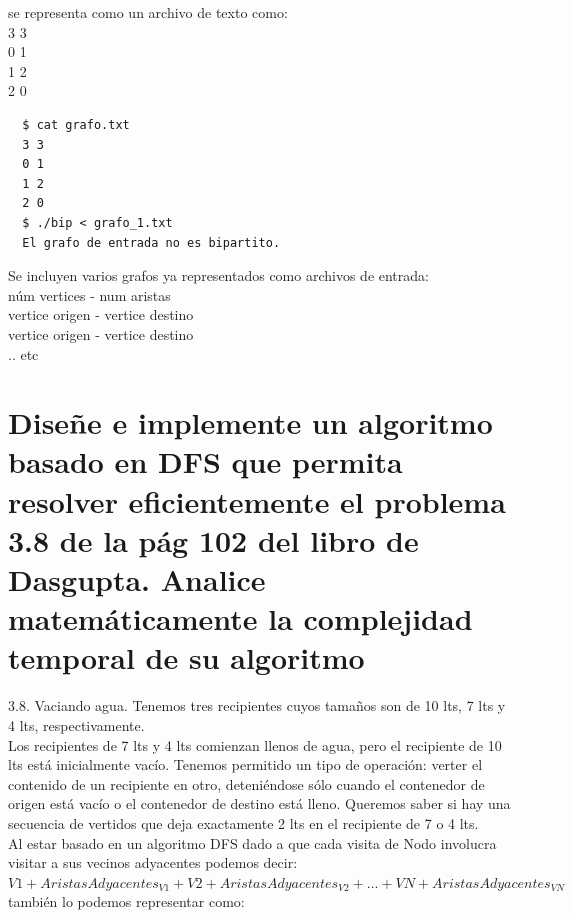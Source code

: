 \documentclass{article}
\begin{document}
se representa como un archivo de texto como:\\
3 3\\
0 1\\
1 2\\
2 0\\

\begin{commandline}
\begin{verbatim}
  $ cat grafo.txt
  3 3
  0 1
  1 2
  2 0
  $ ./bip < grafo_1.txt
  El grafo de entrada no es bipartito.
\end{verbatim}
\end{commandline}

Se incluyen varios grafos ya representados como archivos de entrada:\\
núm vertices - num aristas\\
vertice origen - vertice destino\\
vertice origen - vertice destino\\
.. etc\\

\newpage
\section{Diseñe e implemente un algoritmo basado en DFS que permita resolver eficientemente el problema 3.8 de la pág 102 del libro de Dasgupta. Analice matemáticamente la complejidad temporal de su algoritmo}

3.8. Vaciando agua. Tenemos tres recipientes cuyos tamaños son de 10 lts, 7 lts y 4 lts, respectivamente.\\
Los recipientes de 7 lts y 4 lts comienzan llenos de agua, pero el recipiente de 10 lts está inicialmente vacío. Tenemos permitido un tipo de operación: verter el contenido de un recipiente en otro, deteniéndose sólo cuando el contenedor de origen está vacío o el contenedor de destino está lleno. Queremos saber si hay una secuencia de vertidos que deja exactamente 2 lts en el recipiente de 7 o 4 lts.\\

Al estar basado en un algoritmo DFS dado a que cada visita de Nodo involucra visitar a sus vecinos adyacentes podemos decir:\\

$V1+AristasAdyacentes_{V1}+V2+AristasAdyacentes_{V2} + ... + VN+AristasAdyacentes_{VN}$\\

también lo podemos representar como:\\
\end{document}
